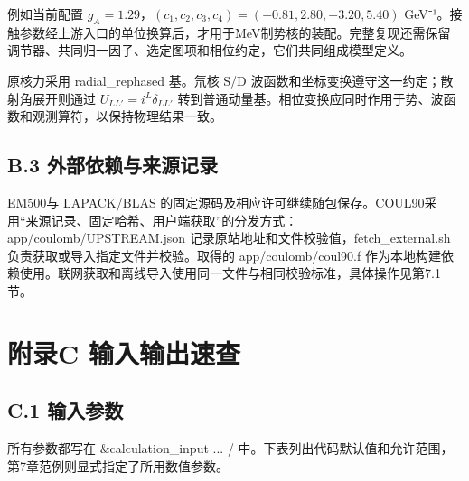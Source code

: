 \documentclass[UTF8,a4paper,zihao=5,fontset=fandol]{ctexart}
\begin{document}
例如当前配置 \(g_A=1.29\)，\((c_1,c_2,c_3,c_4)=(-0.81,2.80,-3.20,5.40)\) GeV⁻¹。接触参数经上游入口的单位换算后，才用于MeV制势核的装配。完整复现还需保留调节器、共同归一因子、选定图项和相位约定，它们共同组成模型定义。

原核力采用 {\ttfamily\small radial\_\allowbreak{}rephased} 基。氘核 S/D 波函数和坐标变换遵守这一约定；散射角展开则通过 \(U_{LL'}=i^L\delta_{LL'}\) 转到普通动量基。相位变换应同时作用于势、波函数和观测算符，以保持物理结果一致。

\subsection*{B.3 外部依赖与来源记录}
EM500与 LAPACK/BLAS 的固定源码及相应许可继续随包保存。COUL90采用“来源记录、固定哈希、用户端获取”的分发方式：{\ttfamily\small app/\allowbreak{}coulomb/\allowbreak{}UPSTREAM.\allowbreak{}json} 记录原站地址和文件校验值，{\ttfamily\small fetch\_\allowbreak{}external.\allowbreak{}sh} 负责获取或导入指定文件并校验。取得的 {\ttfamily\small app/\allowbreak{}coulomb/\allowbreak{}coul90.\allowbreak{}f} 作为本地构建依赖使用。联网获取和离线导入使用同一文件与相同校验标准，具体操作见第7.1节。

\clearpage\section*{附录C 输入输出速查}
\subsection*{C.1 输入参数}
所有参数都写在 {\ttfamily\small \&calculation\_\allowbreak{}input .\allowbreak{}.\allowbreak{}.\allowbreak{} /\allowbreak{}} 中。下表列出代码默认值和允许范围，第7章范例则显式指定了所用数值参数。
\end{document}
